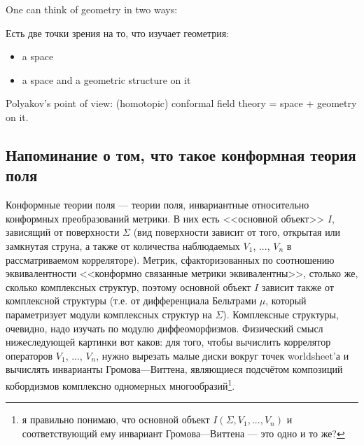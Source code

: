 \documentclass[11pt]{article}
\theoremstyle{remark}
\theoremstyle{definition}
\newcommand{\que}[1]{\footnote{\textcolor[rgb]{0.38,0.69,0.82}{#1}}}
\begin{document}
One can think of geometry in two ways:

Есть две точки зрения на то, что изучает геометрия:

\begin{itemize}
  \item a space
  \item a space and a geometric structure on it
\end{itemize}

Polyakov's point of view: (homotopic) conformal field theory = space + geometry on it.

\subsection{Напоминание о том, что такое конформная теория поля}

Конформные теории поля --- теории поля, инвариантные относительно конформных преобразований метрики. В них есть <<основной объект>> $I$, зависящий от поверхности $\Sigma$ (вид поверхности зависит от того, открытая или замкнутая струна, а также от количества наблюдаемых $V_1$, ..., $V_n$ в рассматриваемом корреляторе). Метрик, сфакторизованных по соотношению эквивалентности <<конформно связанные метрики эквивалентны>>, столько же, сколько комплексных структур, поэтому основной объект $I$ зависит также от комплексной структуры (т.е. от дифференциала Бельтрами $\mu$, который параметризует модули комплексных структур на $\Sigma$). Комплексные структуры, очевидно, надо изучать по модулю диффеоморфизмов. Физический смысл нижеследующей картинки вот каков: для того, чтобы вычислить коррелятор операторов $V_1$, ..., $V_n$, нужно вырезать малые диски вокруг точек worldsheet'а и вычислять инварианты Громова---Виттена, являющиеся подсчётом композиций кобордизмов комплексно одномерных многообразий\que{я правильно понимаю, что основной объект $I(\Sigma, V_1, ..., V_n)$ и соответствующий ему инвариант Громова---Виттена --- это одно и то же?}.
\end{document}
